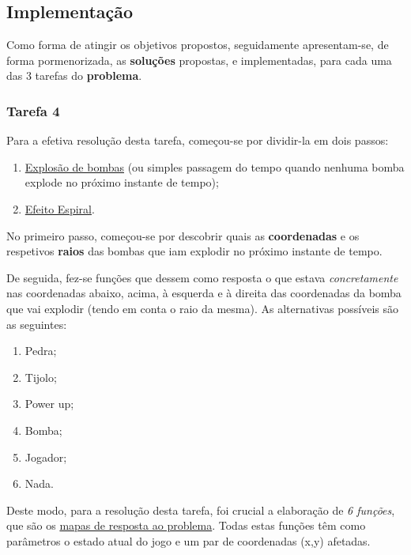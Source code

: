 \documentclass[a4paper]{article}
\begin{document}
\subsection{Implementação}

Como forma de atingir os objetivos propostos, seguidamente apresentam-se, 
de forma pormenorizada, as \textbf{soluções} propostas, e implementadas, para cada 
uma das 3 tarefas do \textbf{problema}.

\subsubsection{Tarefa 4}
\label{sec:solucaoTarefa4}

Para a efetiva resolução desta tarefa, começou-se por dividir-la em dois passos:

\begin{enumerate} 
	\item \underline{Explosão de bombas} (ou simples passagem do tempo 
	quando nenhuma bomba explode no próximo instante de tempo);
	\item \underline{Efeito Espiral}.
\end{enumerate}

No primeiro passo, começou-se por descobrir quais as \textbf{coordenadas} e os respetivos 
\textbf{raios} das bombas que iam explodir no próximo instante de tempo.

De seguida, fez-se funções que dessem como resposta o que estava \emph{concretamente} 
nas coordenadas abaixo, acima, à esquerda e à direita das coordenadas da bomba que vai 
explodir (tendo em conta o raio da mesma). As alternativas possíveis são as seguintes:
\begin{enumerate} 
	\item Pedra;
	\item Tijolo;
	\item Power up; 
	\item Bomba;
	\item Jogador;
	\item Nada.
\end{enumerate}

Deste modo, para a resolução desta tarefa, foi crucial a elaboração de \emph{6 funções}, 
que são os \hypertarget{6funções}{\underline{mapas de resposta ao problema}}. Todas estas funções têm como parâmetros 
o estado atual do jogo e um par de coordenadas (x,y) afetadas.
\end{document}
